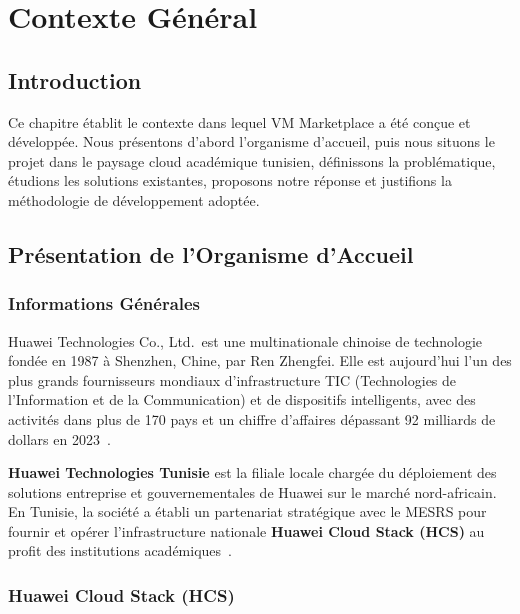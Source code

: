 \chapter{Contexte Général}

\section{Introduction}

Ce chapitre établit le contexte dans lequel VM Marketplace a été conçue et développée.
Nous présentons d'abord l'organisme d'accueil, puis nous situons le projet dans le
paysage cloud académique tunisien, définissons la problématique, étudions les solutions
existantes, proposons notre réponse et justifions la méthodologie de développement
adoptée.

\section{Présentation de l'Organisme d'Accueil}

\subsection{Informations Générales}

Huawei Technologies Co., Ltd.\ est une multinationale chinoise de technologie fondée
en 1987 à Shenzhen, Chine, par Ren Zhengfei. Elle est aujourd'hui l'un des plus grands
fournisseurs mondiaux d'infrastructure TIC (Technologies de l'Information et de la
Communication) et de dispositifs intelligents, avec des activités dans plus de
170 pays et un chiffre d'affaires dépassant 92 milliards de dollars en
2023~\cite{huawei2023annual}.

\textbf{Huawei Technologies Tunisie} est la filiale locale chargée du déploiement
des solutions entreprise et gouvernementales de Huawei sur le marché nord-africain.
En Tunisie, la société a établi un partenariat stratégique avec le MESRS pour fournir
et opérer l'infrastructure nationale \textbf{Huawei Cloud Stack (HCS)} au profit des
institutions académiques~\cite{mesrs_hcs}.

\subsection{Huawei Cloud Stack (HCS)}

